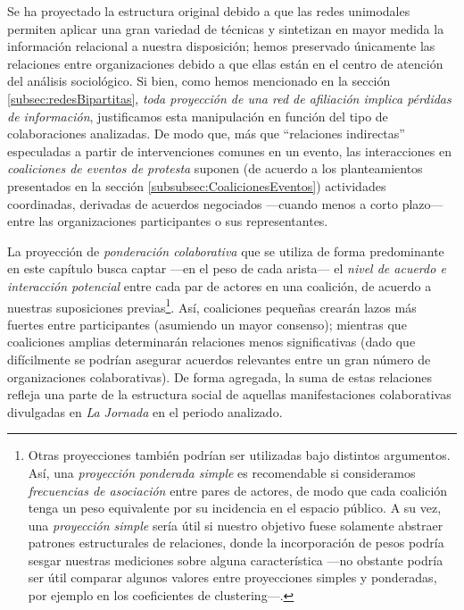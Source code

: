\documentclass[letterpaper, 11pt]{book}
\theoremstyle{definition}
\theoremstyle{remark}
\begin{document}
Se ha proyectado la estructura original debido a que las redes unimodales permiten aplicar una gran variedad de técnicas y sintetizan en mayor medida la información relacional a nuestra disposición; hemos preservado únicamente las relaciones entre organizaciones debido a que ellas están en el centro de atención del análisis sociológico. 
Si bien, como hemos mencionado en la sección \ref{subsec:redesBipartitas}, \emph{toda proyección de una red de afiliación implica pérdidas de información}, justificamos esta manipulación en función del tipo de colaboraciones analizadas. 
De modo que, más que ``relaciones indirectas'' especuladas a partir de intervenciones comunes en un evento, las interacciones en \emph{coaliciones de eventos de protesta} suponen (de acuerdo a los planteamientos presentados en la sección \ref{subsubsec:CoalicionesEventos}) actividades coordinadas, derivadas de acuerdos negociados ---cuando menos a corto plazo--- entre las organizaciones participantes o sus representantes. 


La proyección de \emph{ponderación colaborativa} que se utiliza de forma predominante en este capítulo busca captar ---en el peso de cada arista--- el \emph{nivel de acuerdo e interacción potencial} entre cada par de actores en una coalición, de acuerdo a nuestras suposiciones previas\footnote{
    Otras proyecciones también podrían ser utilizadas bajo distintos argumentos. 
    Así, una \emph{proyección ponderada simple} es recomendable si consideramos \emph{frecuencias de asociación} entre pares de actores, de modo que cada coalición tenga un peso equivalente por su incidencia en el espacio público. 
    A su vez, una \emph{proyección simple} sería útil si nuestro objetivo fuese solamente abstraer patrones estructurales de relaciones, donde la incorporación de pesos podría sesgar nuestras mediciones sobre alguna característica ---no obstante podría ser útil comparar algunos valores entre proyecciones simples y ponderadas, por ejemplo en los coeficientes de clustering---. 
}. 
Así, coaliciones pequeñas crearán lazos más fuertes entre participantes (asumiendo un mayor consenso); mientras que coaliciones amplias determinarán relaciones menos significativas (dado que difícilmente se podrían asegurar acuerdos relevantes entre un gran número de organizaciones colaborativas). 
De forma agregada, la suma de estas relaciones refleja una parte de la estructura social de aquellas manifestaciones colaborativas divulgadas en \emph{La Jornada} en el periodo analizado. 
\end{document}
